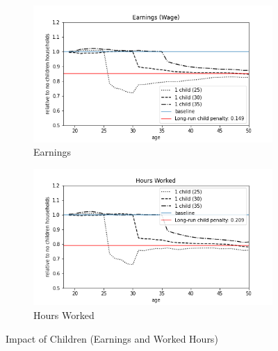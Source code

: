 \begin{figure}[ht]
\begin{subfigure}{.5\textwidth}
  \centering
  \includegraphics[width=1\linewidth]{figures/extended_model_event_earnings.png}
  \caption{Earnings}
  \label{fig:ext_model_event_earnings}
\end{subfigure}%
\begin{subfigure}{.5\textwidth}
  \centering
  \includegraphics[width=1\linewidth]{figures/extended_model_event_hours_worked.png}
  \caption{Hours Worked}
  \label{fig:ext_model_event_hours}
\end{subfigure}
    \caption{Impact of Children (Earnings and Worked Hours)}
    \label{fig:ext_model_impact_earnings_hours}
\end{figure}




